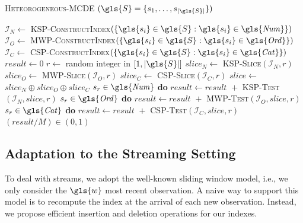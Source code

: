 \begin{algorithm}\footnotesize
	\caption{\textsc{Heteorogeneous-\gls{MCDE}} $( \gls{S} = \{s_1, \dots, s_{|\gls{S}|}\})$}\label{Heterogeneous_MCDE_alg}
	\begin{algorithmic}[1]
		\State $\mathcal{I}_N \gets$ \textsc{\gls{KSP}-ConstructIndex}{$\left(\{\gls{s_i} \in \gls{S}: \gls{s_i} \in \mathit{\gls{Num}}\}\right)$} \label{Heterogeneous_MCDE_indexstart}
		\State $\mathcal{I}_O \gets$ 
		\textsc{\gls{MWP}-ConstructIndex}{$\left(\{\gls{s_i} \in \gls{S}: \gls{s_i} \in \mathit{\gls{Ord}}\}\right)$} 
		\State $\mathcal{I}_C \gets$  \textsc{\gls{CSP}-ConstructIndex}{$\left(\{\gls{s_i} \in \gls{S}: \gls{s_i} \in \mathit{\gls{Cat}}\}\right)$}  \label{Heterogeneous_MCDE_indexend}
		\State $\textit{result} \gets 0$ 
		\State $r \gets$ random integer in $\left[ 1,|\gls{S}| \right]$ 
		\State $\mathit{slice}_{N} \gets$ \textsc{\gls{KSP}-Slice}{$\left( \mathcal{I}_{N}, r \right)$} \label{Heterogeneous_MCDE_slicingstart}
		\State $\mathit{slice}_{O} \gets$ \textsc{\gls{MWP}-Slice}{$\left( \mathcal{I}_{O}, r \right)$}
		\State $\mathit{slice}_{C} \gets$ \textsc{\gls{CSP}-Slice}{$\left( \mathcal{I}_{C}, r \right)$} \label{Heterogeneous_MCDE_slicingend}
		\State $\mathit{slice} \gets$ $\mathit{slice}_{N} \oplus \mathit{slice}_{O} \oplus \mathit{slice}_{C} $ \label{Heterogeneous_MCDE_sliceconjunction}
		 $s_r \in \mathit{\gls{Num}}$ {\bfseries do} $\textit{result} \gets \textit{result } +$ \textsc{\gls{KSP}-Test}{$\left( \mathcal{I}_N , \mathit{slice}, r \right)$}  \label{Heterogeneous_MCDE_teststart}
		 $s_r \in \mathit{\gls{Ord}}$ {\bfseries do} $\textit{result} \gets \textit{result } +$ \textsc{\gls{MWP}-Test}{$\left( \mathcal{I}_O , \mathit{slice}, r \right)$} 
		 $s_r \in \mathit{\gls{Cat}}$ {\bfseries do} $\textit{result} \gets \textit{result } +$ \textsc{\gls{CSP}-Test}{$\left( \mathcal{I}_C , \mathit{slice}, r \right)$} \label{Heterogeneous_MCDE_testend}
		\EndFor
		 $(\textit{result} / M) \in (0,1)$
	\end{algorithmic}
\end{algorithm}

\subsection{Adaptation to the Streaming Setting}

\label{adaptation-stream}

To deal with streams, we adopt the well-known sliding window model, i.e., we only consider the $\gls{w}$ most recent observation. A naive way to support this model is to recompute the index at the arrival of each new observation. Instead, we propose  efficient insertion and deletion operations for our indexes. 

